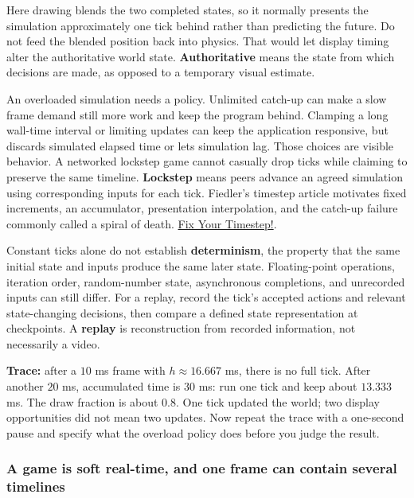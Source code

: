Here drawing blends the two completed states, so it normally presents the simulation approximately one tick behind rather than predicting the future. Do not feed the blended position back into physics. That would let display timing alter the authoritative world state. \textbf{Authoritative} means the state from which decisions are made, as opposed to a temporary visual estimate.

An overloaded simulation needs a policy. Unlimited catch-up can make a slow frame demand still more work and keep the program behind. Clamping a long wall-time interval or limiting updates can keep the application responsive, but discards simulated elapsed time or lets simulation lag. Those choices are visible behavior. A networked lockstep game cannot casually drop ticks while claiming to preserve the same timeline. \textbf{Lockstep} means peers advance an agreed simulation using corresponding inputs for each tick. Fiedler's timestep article motivates fixed increments, an accumulator, presentation interpolation, and the catch-up failure commonly called a spiral of death. \href{https://gafferongames.com/post/fix_your_timestep/}{Fix Your Timestep!}.

Constant ticks alone do not establish \textbf{determinism}, the property that the same initial state and inputs produce the same later state. Floating-point operations, iteration order, random-number state, asynchronous completions, and unrecorded inputs can still differ. For a replay, record the tick's accepted actions and relevant state-changing decisions, then compare a defined state representation at checkpoints. A \textbf{replay} is reconstruction from recorded information, not necessarily a video.

\textbf{Trace:} after a \(10\) ms frame with \(h\approx16.667\) ms, there is no full tick. After another \(20\) ms, accumulated time is \(30\) ms: run one tick and keep about \(13.333\) ms. The draw fraction is about \(0.8\). One tick updated the world; two display opportunities did not mean two updates. Now repeat the trace with a one-second pause and specify what the overload policy does before you judge the result.

\subsubsection{A game is soft real-time, and one frame can contain several timelines}\label{05-engine-i-ch013-a-game-is-soft-real-time-and-one-frame-can-contain-several-timelines}

